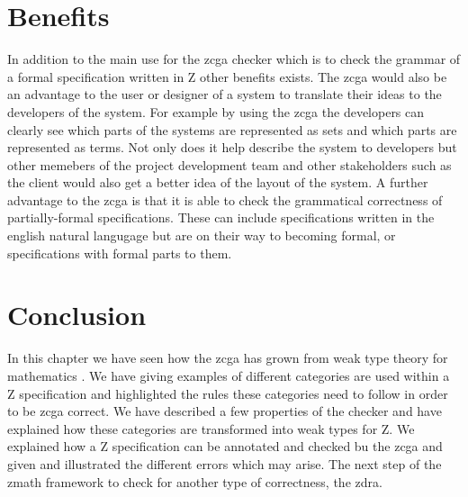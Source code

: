 \section{Benefits}

In addition to the main use for the \gls{zcga} checker which is to check the grammar of a formal specification written in Z other benefits exists. The \gls{zcga} would also be an advantage to the user or designer of a system to translate their ideas to the developers of the system. For example by using the \gls{zcga} the developers can clearly see which parts of the systems are represented as sets and which parts are represented as terms. Not only does it help describe the system to developers but other memebers of the project development team and other stakeholders such as the client would also get a better idea of the layout of the system.
A further advantage to the \gls{zcga} is that it is able to check the grammatical correctness of partially-formal specifications. These can include specifications written in the english natural langugage but are on their way to becoming formal, or specifications with formal parts to them.

\section{Conclusion}
In this chapter we have seen how the \gls{zcga} has grown from weak type theory for mathematics \cite{wtt}. We have giving examples of different categories are used within a Z specification and highlighted the rules these categories need to follow in order to be \gls{zcga} correct. We have described a few properties of the checker and have explained how these categories are transformed into weak types for Z. We explained how a Z specification can be annotated and checked bu the \gls{zcga} and given and illustrated the different errors which may arise. The next step of the \gls{zmath} framework to check for another type of correctness, the \gls{zdra}.
